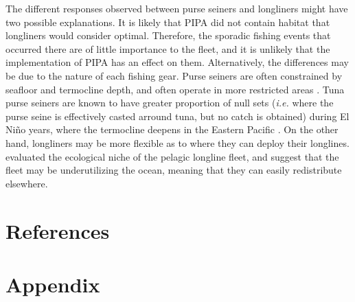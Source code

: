 \documentclass[12pt,]{article}
\begin{document}
The different responses observed between purse seiners and longliners
might have two possible explanations. It is likely that PIPA did not
contain habitat that longliners would consider optimal. Therefore, the
sporadic fishing events that occurred there are of little importance to
the fleet, and it is unlikely that the implementation of PIPA has an
effect on them. Alternatively, the differences may be due to the nature
of each fishing gear. Purse seiners are often constrained by seafloor
and termocline depth, and often operate in more restricted areas
\citep{kroodsma_2018}. Tuna purse seiners are known to have greater
proportion of null sets (\emph{i.e.} where the purse seine is
effectively casted arround tuna, but no catch is obtained) during El
Niño years, where the termocline deepens in the Eastern Pacific
\citep{dreyfusleon_2015}. On the other hand, longliners may be more
flexible as to where they can deploy their longlines.
\citet{ortuocrespo_2018} evaluated the ecological niche of the pelagic
longline fleet, and suggest that the fleet may be underutilizing the
ocean, meaning that they can easily redistribute elsewhere.

\section{References}\label{references}

\hypertarget{refs}{}

\clearpage

\section{Appendix}\label{appendix}
\end{document}

